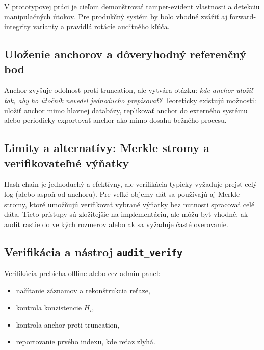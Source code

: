 \documentclass[journal,a4paper,onecolumn]{IEEEtran}
\begin{document}
V prototypovej práci je cieľom demonštrovať tamper-evident vlastnosti a detekciu manipulačných útokov. Pre produkčný systém by bolo vhodné zvážiť aj forward-integrity varianty a pravidlá rotácie auditného kľúča.

\subsection{Uloženie anchorov a dôveryhodný referenčný bod}

Anchor zvyšuje odolnosť proti truncation, ale vytvára otázku: \emph{kde anchor uložiť tak, aby ho útočník nevedel jednoducho prepisovať?} Teoreticky existujú možnosti: uložiť anchor mimo hlavnej databázy, replikovať anchor do externého systému alebo periodicky exportovať anchor ako  mimo dosahu bežného procesu.

\subsection{Limity a alternatívy: Merkle stromy a verifikovateľné výňatky}

Hash chain je jednoduchý a efektívny, ale verifikácia typicky vyžaduje prejsť celý log (alebo aspoň od anchoru). Pre veľké objemy dát sa používajú aj Merkle stromy, ktoré umožňujú verifikovať vybrané výňatky bez nutnosti spracovať celé dáta. Tieto prístupy sú zložitejšie na implementáciu, ale môžu byť vhodné, ak audit rastie do veľkých rozmerov alebo ak sa vyžaduje časté overovanie.


\subsection{Verifikácia a nástroj \texttt{audit\_verify}}

Verifikácia prebieha offline alebo cez admin panel:

\begin{itemize}[leftmargin=*,itemsep=2pt]
  \item načítanie záznamov a rekonštrukcia reťaze,
  \item kontrola konzistencie \(H_i\),
  \item kontrola anchor proti truncation,
  \item reportovanie prvého indexu, kde reťaz zlyhá.
\end{itemize}

\end{document}
